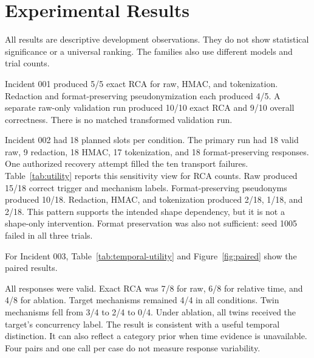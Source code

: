\section{Experimental Results}
\label{sec:results}
All results are descriptive development observations. They do not show
statistical significance or a universal ranking. The families also use
different models and trial counts.


Incident 001 produced 5/5 exact RCA for raw, HMAC, and tokenization. Redaction
and format-preserving pseudonymization each produced 4/5. A separate raw-only
validation run produced 10/10 exact RCA and 9/10 overall correctness. There is
no matched transformed validation run.

Incident 002 had 18 planned slots per condition. The primary run had 18 valid
raw, 9 redaction, 18 HMAC, 17 tokenization, and 18 format-preserving
responses. One authorized recovery attempt filled the ten transport failures.
Table~\ref{tab:utility} reports this sensitivity view for RCA counts. Raw
produced 15/18 correct trigger and mechanism labels. Format-preserving
pseudonyms produced 10/18. Redaction, HMAC, and tokenization produced 2/18,
1/18, and 2/18. This pattern supports the intended shape dependency, but it is
not a shape-only intervention. Format preservation was also not sufficient:
seed 1005 failed in all three trials.

For Incident 003, Table~\ref{tab:temporal-utility} and
Figure~\ref{fig:paired} show the paired results.


All responses were valid. Exact RCA was 7/8 for raw, 6/8 for relative time,
and 4/8 for ablation. Target mechanisms remained 4/4 in all conditions.
Twin mechanisms fell from 3/4 to 2/4 to 0/4. Under ablation, all twins received
the target's concurrency label. The result is consistent with a useful
temporal distinction. It can also reflect a category prior when time evidence
is unavailable. Four pairs and one call per case do not measure response
variability.
